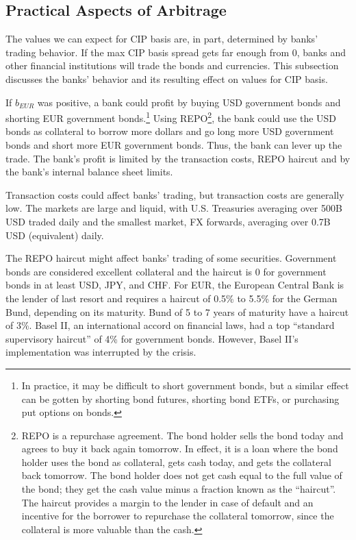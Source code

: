 \fi




\subsection{Practical Aspects of Arbitrage}

The values we can expect for CIP basis are, in part, determined by banks' trading behavior.  If the max CIP basis spread gets far enough from 0, banks and other financial institutions will trade the bonds and currencies.  This subsection discusses the banks' behavior and its resulting effect on values for CIP basis.  

If $b_{EUR}$ was positive, a bank could profit by buying USD government bonds and shorting EUR government bonds.\footnote{In practice, it may be difficult to short government bonds, but a similar effect can be gotten by shorting bond futures, shorting bond ETFs, or purchasing put options on bonds.}  Using REPO\footnote{REPO is a repurchase agreement.  The bond holder sells the bond today and agrees to buy it back again tomorrow.  In effect, it is a loan where the bond holder uses the bond as collateral, gets cash today, and gets the collateral back tomorrow.  The bond holder does not get cash equal to the full value of the bond; they get the cash value minus a fraction known as the ``haircut''.  The haircut provides a margin to the lender in case of default and an incentive for the borrower to repurchase the collateral tomorrow, since the collateral is more valuable than the cash.}, the bank could use the USD bonds as collateral to borrow more dollars and go long more USD government bonds and short more EUR government bonds.  Thus, the bank can lever up the trade.  The bank's profit is limited by the transaction costs, REPO haircut and by the bank's internal balance sheet limits.  

Transaction costs could affect banks' trading, but transaction costs are generally low.   The markets are large and liquid, with U.S. Treasuries averaging over 500B USD traded daily and the smallest market, FX forwards, averaging over 0.7B USD (equivalent) daily.\cite{BIS2016}

The REPO haircut might affect banks' trading of some securities.  Government bonds are considered excellent collateral and the haircut is 0 for government bonds in at least USD, JPY, and CHF.\cite{Du2017}   For EUR, the European Central Bank is the lender of last resort and requires a haircut of 0.5\% to 5.5\% for the German Bund, depending on its maturity.\cite{Cassola2016}  Bund of 5 to 7 years of maturity have a haircut of 3\%.  Basel II, an international accord on financial laws, had a top ``standard supervisory haircut'' of 4\% for government bonds.\cite{BaselII}  However, Basel II's implementation was interrupted by the crisis. 

